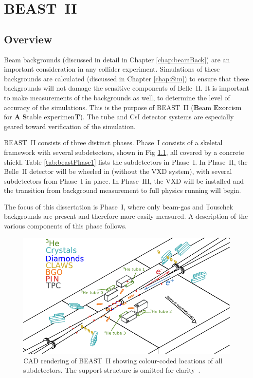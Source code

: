
\chapter{BEAST~II}
\label{chap:BEASTDet}



\section{Overview}

	Beam backgrounds (discussed in detail in Chapter \ref{chap:beamBack}) are an important consideration in any collider experiment. Simulations of these backgrounds are calculated (discussed in Chapter \ref{chap:Sim}) to ensure that these backgrounds will not damage the sensitive components of Belle~II. It is important to make measurements of the backgrounds as well, to determine the level of accuracy of the simulations. This is the purpose of BEAST~II (\textbf{B}eam \textbf{E}xorcism for \textbf{A} \textbf{S}table experimen\textbf{T}). The \he tube and CsI detector systems are especially geared toward verification of the simulation.

	BEAST~II consists of three distinct phases. Phase~I consists of a skeletal framework with several subdetectors, shown in Fig \ref{fig:beastRender}, all covered by a concrete shield. Table \ref{tab:beastPhase1} lists the subdetectors in Phase~I. In Phase~II, the Belle~II detector will be wheeled in (without the VXD system), with several subdetectors from Phase~I in place. In Phase~III, the VXD will be installed and the transition from background measurement to full physics running will begin.

	The focus of this dissertation is Phase~I, where only beam-gas and Touschek backgrounds are present and therefore more easily measured. A description of the various components of this phase follows.

\begin{figure}[htb]
	\centerfloat
		\includegraphics[width=\textwidth]{images/BEAST-Phase1-LineArt-16-9_IsoMetric-Colours-EmbeddedText}
	\caption[CAD rendering of BEAST~II in Phase~I]{CAD rendering of BEAST~II showing colour-coded locations of all subdetectors. The support structure is omitted for clarity~\cite{BEASTPAPER}.}
	\label{fig:beastRender}
\end{figure}


